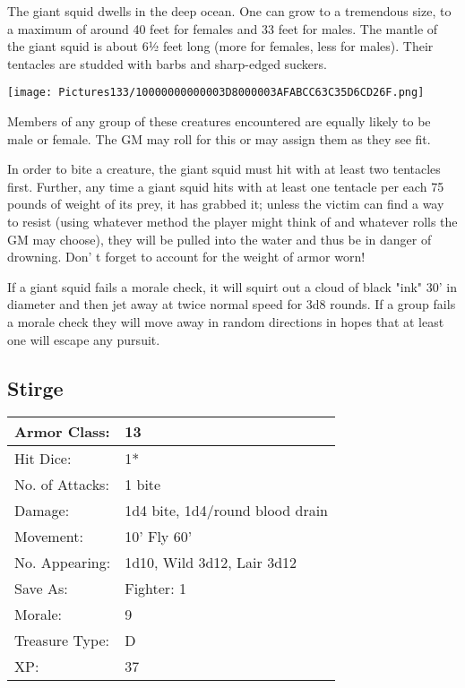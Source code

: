 \documentclass[a4paper,twoside,openany,10pt]{book}
\begin{document}
\begin{multicols}{2}
The
giant squid dwells in the deep ocean. One can grow to a tremendous size, to a maximum of around 40 feet for females and 33 feet for males. The mantle of the giant squid is about 6½ feet long (more for females, less for males). Their tentacles are studded with barbs and sharp-edged suckers.


\begin{center} \texttt{[image: Pictures133/10000000000003D8000003AFABCC63C35D6CD26F.png]} \end{center}

Members of any group of these creatures encountered are equally likely to be male or female. The GM may roll for this or may assign them as they see fit.

In order to bite a creature, the giant squid must hit with at least two tentacles first. Further, any time a giant squid hits with at least one tentacle per each 75 pounds of weight of its prey, it has grabbed it; unless the victim can find a way to resist (using whatever method the player might think of and whatever rolls the GM may choose), they will be pulled into the water and thus be in danger of drowning. Don' t forget to account for the weight of armor worn!

If a giant squid fails a morale check, it will squirt out a cloud of black "ink" 30' in diameter and then jet away at twice normal speed for 3d8 rounds. If a group fails a morale check they will move away in random directions in hopes that at least one will escape any pursuit.

\subsection*{Stirge}\label{stirge}

\begin{tabularx}{0.50\textwidth}{@{}lX@{}}
Armor Class: & 13 \\\hline
Hit Dice: & 1* \\\hline
No. of Attacks: & 1 bite \\\hline
Damage: & 1d4 bite, 1d4/round blood drain \\\hline
Movement: & 10' Fly 60' \\\hline
No. Appearing: & 1d10, Wild 3d12, Lair 3d12 \\\hline
Save As: & Fighter: 1 \\\hline
Morale: & 9 \\\hline
Treasure Type: & D \\\hline
XP: & 37 \\\hline
\end{tabularx}\medskip


\end{multicols}
\end{document}
